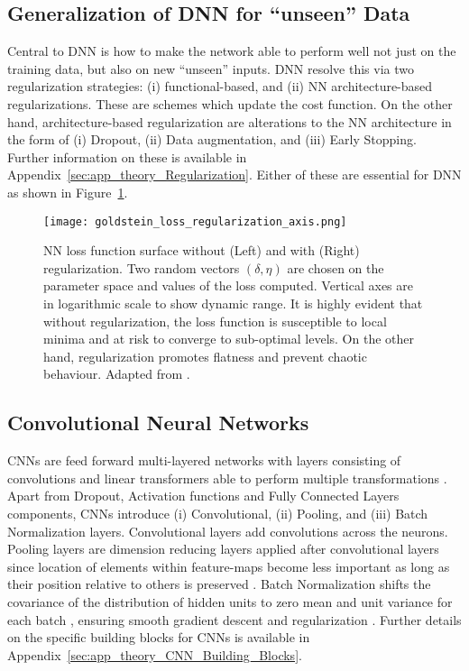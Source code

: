 \subsection{Generalization of DNN for “unseen” Data}\label{sec:theory_generalization}
Central to DNN is how to make the network able to perform well not just on the training data, but also on new “unseen” inputs. DNN resolve this via two regularization strategies: (i) functional-based, and (ii) NN architecture-based regularizations. These are schemes which update the cost function. On the other hand, architecture-based regularization are alterations to the NN architecture in the form of (i) Dropout, (ii) Data augmentation, and (iii) Early Stopping. Further information on these is available in Appendix~\ref{sec:app_theory_Regularization}. Either of these are essential for DNN as shown in Figure~\ref{fig:DNN_regularization}.

\begin{figure}[ht!]
	\centering
	\texttt{[image: goldstein\_loss\_regularization\_axis.png]}
	\caption[NN loss function without and with regularization]{NN loss function surface without (Left) and with (Right) regularization. Two random vectors $\left(\delta,\eta\right)$ are chosen on the parameter space and values of the loss computed. Vertical axes are in logarithmic scale to show dynamic range. It is highly evident that without regularization, the loss function is susceptible to local minima and at risk to converge to sub-optimal levels. On the other hand, regularization promotes flatness and prevent chaotic behaviour. Adapted from \cite{Li2017}.}
	\label{fig:DNN_regularization}
\end{figure}

\subsection{Convolutional Neural Networks}
CNNs are feed forward multi-layered networks with layers consisting of convolutions and linear transformers able to perform multiple transformations \citep{LeCun2010}. Apart from Dropout, Activation functions and Fully Connected Layers components, CNNs introduce (i) Convolutional, (ii) Pooling, and (iii) Batch Normalization layers. Convolutional layers add convolutions across the neurons. Pooling layers are dimension reducing layers applied after convolutional layers since location of elements within feature-maps become less important as long as their position relative to others is preserved \citep{Khan2020}. Batch Normalization shifts the covariance of the distribution of hidden units to zero mean and unit variance for each batch \citep{Ioffe2015}, ensuring smooth gradient descent and regularization \citep{Santurkar2018}. Further details on the specific building blocks for CNNs is available in Appendix~\ref{sec:app_theory_CNN_Building_Blocks}.

